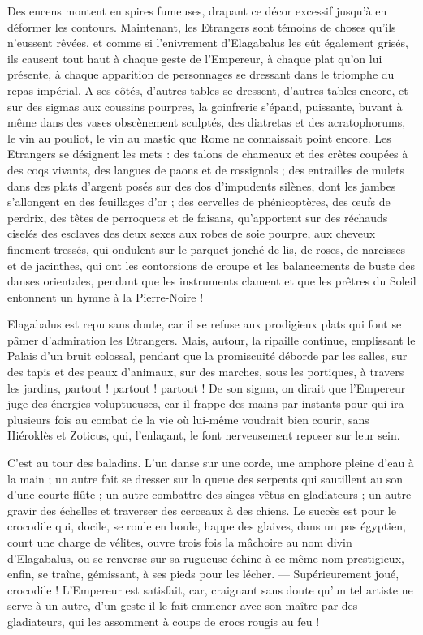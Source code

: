 \documentclass[a4paper, 11pt, oneside, polutonikogreek, french]{article}
\begin{document}
Des encens montent en spires fumeuses, drapant ce décor excessif jusqu'à en déformer les contours. Maintenant, les Etrangers sont témoins de choses qu'ils n'eussent rêvées, et comme si l'enivrement d'Elagabalus les eût également grisés, ils causent tout haut à chaque geste de l'Empereur, à chaque plat qu'on lui présente, à chaque apparition de personnages se dressant dans le triomphe du repas impérial. A ses côtés, d'autres tables se dressent, d'autres tables encore, et sur des sigmas aux coussins pourpres, la goinfrerie s'épand, puissante, buvant à même dans des vases obscènement sculptés, des diatretas et des acratophorums, le vin au pouliot, le vin au mastic que Rome ne connaissait point encore. Les Etrangers se désignent les mets : des talons de chameaux et des crêtes coupées à des coqs vivants, des langues de paons et de rossignols ; des entrailles de mulets dans des plats d'argent posés sur des dos d'impudents silènes, dont les jambes s'allongent en des feuillages d'or ; des cervelles de phénicoptères, des œufs de perdrix, des têtes de perroquets et de faisans, qu'apportent sur des réchauds ciselés des esclaves des deux sexes aux robes de soie pourpre, aux cheveux finement tressés, qui ondulent sur le parquet jonché de lis, de roses, de narcisses et de jacinthes, qui ont les contorsions de croupe et les balancements de buste des danses orientales, pendant que les instruments clament et que les prêtres du Soleil entonnent un hymne à la Pierre-Noire !

Elagabalus est repu sans doute, car il se refuse aux prodigieux plats qui font se pâmer d'admiration les Etrangers. Mais, autour, la ripaille continue, emplissant le Palais d'un bruit colossal, pendant que la promiscuité déborde par les salles, sur des tapis et des peaux d'animaux, sur des marches, sous les portiques, à travers les jardins, partout ! partout ! partout ! De son sigma, on dirait que l'Empereur juge des énergies voluptueuses, car il frappe des mains par instants pour qui ira plusieurs fois au combat de la vie où lui-même voudrait bien courir, sans Hiéroklès et Zoticus, qui, l'enlaçant, le font nerveusement reposer sur leur sein.

C'est au tour des baladins. L'un danse sur une corde, une amphore pleine d'eau à la main ; un autre fait se dresser sur la queue des serpents qui sautillent au son d'une courte flûte ; un autre combattre des singes vêtus en gladiateurs ; un autre gravir des échelles et traverser des cerceaux à des chiens. Le succès est pour le crocodile qui, docile, se roule en boule, happe des glaives, dans un pas égyptien, court une charge de vélites, ouvre trois fois la mâchoire au nom divin d'Elagabalus, ou se renverse sur sa rugueuse échine à ce même nom prestigieux, enfin, se traîne, gémissant, à ses pieds pour les lécher. --- Supérieurement joué, crocodile ! L'Empereur est satisfait, car, craignant sans doute qu'un tel artiste ne serve à un autre, d'un geste il le fait emmener avec son maître par des gladiateurs, qui les assomment à coups de crocs rougis au feu !
\end{document}
